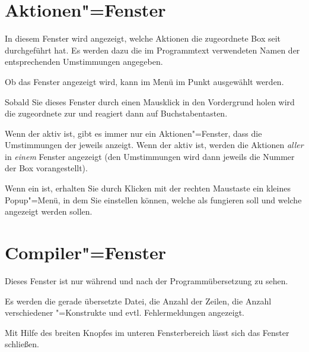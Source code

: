 {\section{Aktionen"=Fenster}\label{sec:DE_ACTION}
In diesem Fenster wird angezeigt, welche Aktionen die zugeordnete 
Box seit  durchgeführt 
hat. Es werden dazu die im Programmtext verwendeten Namen der 
entsprechenden Umstimmungen angegeben.


Ob das Fenster angezeigt wird, kann im Menü  
im Punkt  ausgewählt werden.


Sobald Sie dieses Fenster durch einen Mausklick in den Vordergrund
holen wird die zugeordnete  zur
 und reagiert dann auf
Buchstabentasten.


Wenn der  aktiv ist, gibt es
immer nur ein Aktionen"=Fenster, dass die Umstimmungen der jeweils
 anzeigt. Wenn der
 aktiv ist,
werden die Aktionen \emph{aller}
 in \emph{einem} Fenster
angezeigt (den Umstimmungen wird dann jeweils die Nummer der Box
vorangestellt).


Wenn ein 
 ist, erhalten Sie durch Klicken
mit der rechten Maustaste ein kleines Popup"=Menü, in dem Sie
einstellen können, welche  als
 fungieren soll und welche
 angezeigt werden sollen.



\section{Compiler"=Fenster}\label{sec:DE_COMP}
Dieses Fenster ist nur während und nach der Programmübersetzung 
zu sehen.

Es werden die gerade übersetzte Datei, die Anzahl der Zeilen, 
die Anzahl verschiedener \mutabor{}"=Konstrukte und evtl. Fehlermeldungen 
angezeigt.

Mit Hilfe des breiten Knopfes im unteren Fensterbereich lässt 
sich das Fenster schließen.

}
